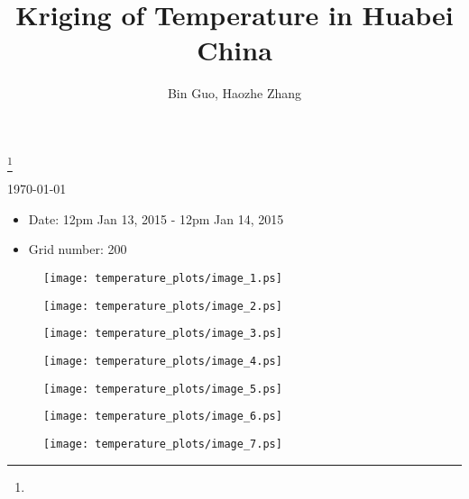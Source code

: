 \documentclass[11pt]{amsart}
\theoremstyle{plain}%
\theoremstyle{definition}
\theoremstyle{remark}
\numberwithin{equation}{thm}
\begin{document}
\title{Kriging of Temperature in Huabei China}
\thanks{}
\author[Guo, Zhang]{Bin Guo, Haozhe Zhang}
\today

\maketitle
\begin{itemize}
\item Date: 12pm Jan 13, 2015  - 12pm Jan 14, 2015
\item Grid number: 200
\end{itemize}

\begin{figure}[H]
\begin{center}
\texttt{[image: temperature\_plots/image\_1.ps]} 
\end{center}
\end{figure}

\begin{figure}[H]
\begin{center}
\texttt{[image: temperature\_plots/image\_2.ps]} 
\end{center}
\end{figure}

\begin{figure}[H]
\begin{center}
\texttt{[image: temperature\_plots/image\_3.ps]} 
\end{center}
\end{figure}

\begin{figure}[H]
\begin{center}
\texttt{[image: temperature\_plots/image\_4.ps]} 
\end{center}
\end{figure}

\begin{figure}[H]
\begin{center}
\texttt{[image: temperature\_plots/image\_5.ps]} 
\end{center}
\end{figure}

\begin{figure}[H]
\begin{center}
\texttt{[image: temperature\_plots/image\_6.ps]} 
\end{center}
\end{figure}

\begin{figure}[H]
\begin{center}
\texttt{[image: temperature\_plots/image\_7.ps]} 
\end{center}
\end{figure}
\end{document}
